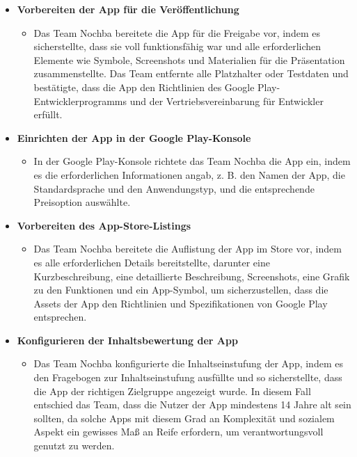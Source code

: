 \begin{itemize}
    \item \textbf{Vorbereiten der App für die Veröffentlichung}
          \begin{itemize}
              \item {Das Team Nochba bereitete die App für die Freigabe vor, indem es sicherstellte, dass sie voll funktionsfähig war und alle erforderlichen Elemente wie Symbole, Screenshots und Materialien für die Präsentation zusammenstellte. Das Team entfernte alle Platzhalter oder Testdaten und bestätigte, dass die App den Richtlinien des Google Play-Entwicklerprogramms und der Vertriebsvereinbarung für Entwickler erfüllt.}
          \end{itemize}
    \item \textbf{Einrichten der App in der Google Play-Konsole}
          \begin{itemize}
              \item {In der Google Play-Konsole richtete das Team Nochba die App ein, indem es die erforderlichen Informationen angab, z. B. den Namen der App, die Standardsprache und den Anwendungstyp, und die entsprechende Preisoption auswählte.}
          \end{itemize}
    \item \textbf{Vorbereiten des App-Store-Listings}
          \begin{itemize}
              \item {Das Team Nochba bereitete die Auflistung der App im Store vor, indem es alle erforderlichen Details bereitstellte, darunter eine Kurzbeschreibung, eine detaillierte Beschreibung, Screenshots, eine Grafik zu den Funktionen und ein App-Symbol, um sicherzustellen, dass die Assets der App den Richtlinien und Spezifikationen von Google Play entsprechen.}
          \end{itemize}
    \item \textbf{Konfigurieren der Inhaltsbewertung der App}
          \begin{itemize}
              \item {Das Team Nochba konfigurierte die Inhaltseinstufung der App, indem es den Fragebogen zur Inhaltseinstufung ausfüllte und so sicherstellte, dass die App der richtigen Zielgruppe angezeigt wurde. In diesem Fall entschied das Team, dass die Nutzer der App mindestens 14 Jahre alt sein sollten, da solche Apps mit diesem Grad an Komplexität und sozialem Aspekt ein gewisses Maß an Reife erfordern, um verantwortungsvoll genutzt zu werden.}
          \end{itemize}

\end{itemize}
